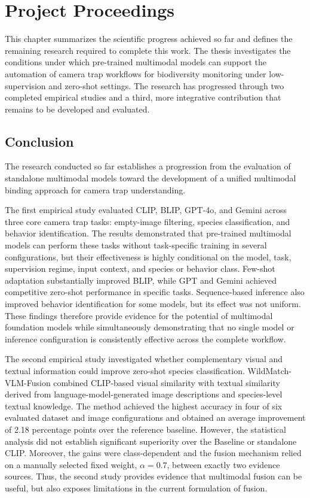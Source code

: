 \chapter{Project Proceedings}\label{cap:conclusion}

This chapter summarizes the scientific progress achieved so far and defines the remaining research required to complete this work. The thesis investigates the conditions under which pre-trained multimodal models can support the automation of camera trap workflows for biodiversity monitoring under low-supervision and zero-shot settings. The research has progressed through two completed empirical studies and a third, more integrative contribution that remains to be developed and evaluated.

\section{Conclusion}\label{sec:project_conclusion}

The research conducted so far establishes a progression from the evaluation of standalone multimodal models toward the development of a unified multimodal binding approach for camera trap understanding.

The first empirical study evaluated CLIP, BLIP, GPT-4o, and Gemini across three core camera trap tasks: empty-image filtering, species classification, and behavior identification. The results demonstrated that pre-trained multimodal models can perform these tasks without task-specific training in several configurations, but their effectiveness is highly conditional on the model, task, supervision regime, input context, and species or behavior class. Few-shot adaptation substantially improved BLIP, while GPT and Gemini achieved competitive zero-shot performance in specific tasks. Sequence-based inference also improved behavior identification for some models, but its effect was not uniform. These findings therefore provide evidence for the potential of multimodal foundation models while simultaneously demonstrating that no single model or inference configuration is consistently effective across the complete workflow.

The second empirical study investigated whether complementary visual and textual information could improve zero-shot species classification. WildMatch-VLM-Fusion combined CLIP-based visual similarity with textual similarity derived from language-model-generated image descriptions and species-level textual knowledge. The method achieved the highest accuracy in four of six evaluated dataset and image configurations and obtained an average improvement of 2.18 percentage points over the reference baseline. However, the statistical analysis did not establish significant superiority over the Baseline or standalone CLIP. Moreover, the gains were class-dependent and the fusion mechanism relied on a manually selected fixed weight, $\alpha=0.7$, between exactly two evidence sources. Thus, the second study provides evidence that multimodal fusion can be useful, but also exposes limitations in the current formulation of fusion.

